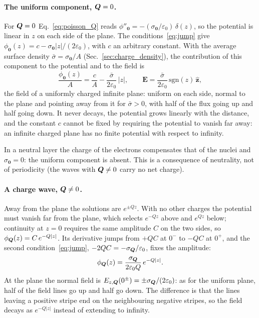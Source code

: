 \documentclass[10pt,a4paper]{paper}
\begin{document}
\paragraph{The uniform component, $\bm{Q} = 0$.} For $\bm{Q} = 0$ Eq.~\eqref{eq:poisson_Q} reads
$\phi''_{\bm{0}} = -(\sigma_{\bm{0}}/\varepsilon_0)\,\delta(z)$, so the potential is linear in $z$ on each side of
the plane. The conditions~\eqref{eq:jump} give $\phi_{\bm{0}}(z) = c - \sigma_{\bm{0}}|z|/(2\varepsilon_0)$, with
$c$ an arbitrary constant. With the average surface density $\bar{\sigma} = \sigma_{\bm{0}}/A$
(Sec.~\ref{sec:charge_density}), the contribution of this component to the potential and to the field is
\begin{equation}
\frac{\phi_{\bm{0}}(z)}{A} = \frac{c}{A} - \frac{\bar{\sigma}}{2\varepsilon_0}\,|z| , \qquad
\bm{E} = \frac{\bar{\sigma}}{2\varepsilon_0}\,\mathrm{sgn}(z)\,\hat{\bm{z}} ,
\label{eq:phi_uniform}
\end{equation}
the field of a uniformly charged infinite plane: uniform on each side, normal to
the plane and pointing away from it for $\bar{\sigma} > 0$, with half of the flux going up and half going down. It
never decays, the potential grows linearly with the distance, and the constant $c$ cannot be fixed by requiring the
potential to vanish far away: an infinite charged plane has no finite potential with respect to infinity.

In a neutral layer the charge of the electrons compensates that of the nuclei and $\sigma_{\bm{0}} = 0$: the uniform
component is absent. This is a consequence of neutrality, not of periodicity (the waves with $\bm{Q} \neq 0$ carry no
net charge). 

\paragraph{A charge wave, $\bm{Q} \neq 0$.} Away from the plane the solutions are $e^{\pm Qz}$. With no other charges
the potential must vanish far from the plane, which selects $e^{-Qz}$ above and $e^{Qz}$ below; continuity at
$z = 0$ requires the same amplitude $C$ on the two sides, so $\phi_{\bm{Q}}(z) = C\,e^{-Q|z|}$. Its derivative jumps
from $+QC$ at $0^-$ to $-QC$ at $0^+$, and the second condition~\eqref{eq:jump}, $-2QC = -\sigma_{\bm{Q}}/\varepsilon_0$,
fixes the amplitude:
\begin{equation}
\phi_{\bm{Q}}(z) = \frac{\sigma_{\bm{Q}}}{2\varepsilon_0 Q}\,e^{-Q|z|} .
\label{eq:phi_free}
\end{equation}
At the plane the normal field is $E_{z,\bm{Q}}(0^\pm) = \pm\sigma_{\bm{Q}}/(2\varepsilon_0)$: as for the uniform plane,
half of the field lines go up and half go down. The difference is that the lines leaving a positive stripe end on
the neighbouring negative stripes, so the field decays as $e^{-Q|z|}$ instead of extending to infinity.
\end{document}
